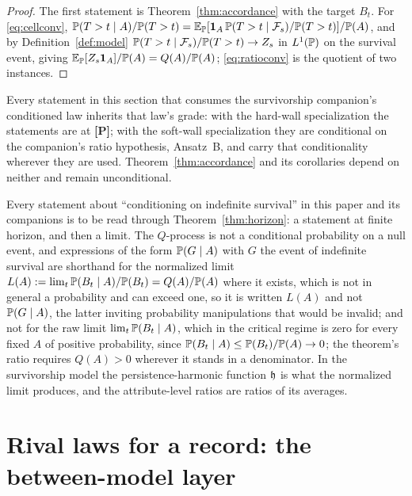 \begin{proof}
The first statement is Theorem~\ref{thm:accordance} with the target
$B_t$. For \eqref{eq:cellconv},
$\mathbb{P}(T>t\mid A)/\mathbb{P}(T>t)=\mathbb{E}_{\mathbb{P}}[\mathbf{1}_A\,\mathbb{P}(T>t\mid\mathcal{F}_s)/\mathbb{P}(T>t)]/\mathbb{P}(A)$,
and by Definition~\ref{def:model} $\mathbb{P}(T>t\mid\mathcal{F}_s)/\mathbb{P}(T>t)\to Z_s$
in $L^1(\mathbb{P})$ on the survival event, giving $\mathbb{E}_{\mathbb{P}}[Z_s\mathbf{1}_A]/\mathbb{P}(A)
=Q(A)/\mathbb{P}(A)$; \eqref{eq:ratioconv} is the quotient of two instances.
\end{proof}

\begin{remark}\label{rem:grades}
Every statement in this section that consumes the survivorship
companion's conditioned law inherits that law's grade: with the
hard-wall specialization the statements are at \textbf{[P]}; with the
soft-wall specialization they are conditional on the companion's ratio
hypothesis, Ansatz~B, and carry that conditionality wherever they are
used. Theorem~\ref{thm:accordance} and its corollaries depend on neither
and remain unconditional.
\end{remark}

\begin{remark}\label{rem:limit}
Every statement about ``conditioning on indefinite survival'' in this
paper and its companions is to be read through Theorem~\ref{thm:horizon}:
a statement at finite horizon, and then a limit. The $Q$-process is not a
conditional probability on a null event, and expressions of the form
$\mathbb{P}(G\mid A)$ with $G$ the event of indefinite survival are shorthand for the normalized limit $L(A) := \lim_t \mathbb{P}(B_t \mid A)/\mathbb{P}(B_t) = Q(A)/\mathbb{P}(A)$ where it exists, which is not in general a probability and can exceed one, so it is written $L(A)$ and not $\mathbb{P}(G \mid A)$, the latter inviting probability manipulations that would be invalid; and not for the raw limit $\lim_t \mathbb{P}(B_t \mid A)$, which in the critical regime is zero for every fixed $A$ of positive probability, since $\mathbb{P}(B_t \mid A) \le \mathbb{P}(B_t)/\mathbb{P}(A) \to 0$; the theorem's ratio requires $Q(A) > 0$ wherever it stands in a denominator. In the survivorship model the persistence-harmonic function $\mathfrak{h}$ is what the normalized limit produces, and
the attribute-level ratios are ratios of its averages.
\end{remark}

\section{Rival laws for a record: the between-model layer}
\label{sec:models}

